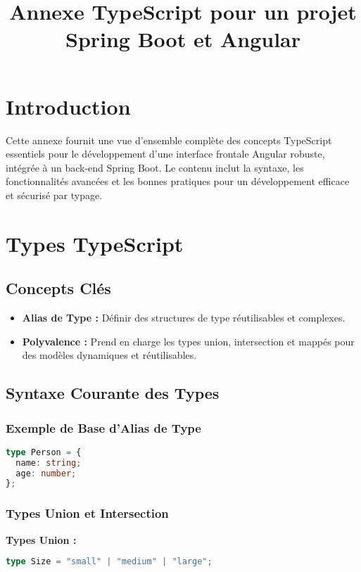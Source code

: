 \documentclass[a4paper,12pt]{article}
\begin{document}
\title{\textbf{Annexe TypeScript pour un projet Spring Boot et Angular}}
\author{}
\date{}
\maketitle

\section*{Introduction}
Cette annexe fournit une vue d'ensemble complète des concepts TypeScript essentiels pour le développement d'une interface frontale Angular robuste, intégrée à un back-end Spring Boot. Le contenu inclut la syntaxe, les fonctionnalités avancées et les bonnes pratiques pour un développement efficace et sécurisé par typage.

\section{Types TypeScript}
\subsection*{Concepts Clés}
\begin{itemize}
    \item \textbf{Alias de Type :} Définir des structures de type réutilisables et complexes.
    \item \textbf{Polyvalence :} Prend en charge les types union, intersection et mappés pour des modèles dynamiques et réutilisables.
\end{itemize}

\subsection*{Syntaxe Courante des Types}
\subsubsection*{Exemple de Base d'Alias de Type}
\begin{lstlisting}[language=TypeScript]
type Person = {
  name: string;
  age: number;
};
\end{lstlisting}

\subsubsection*{Types Union et Intersection}
\textbf{Types Union :}
\begin{lstlisting}[language=TypeScript]
type Size = "small" | "medium" | "large";
\end{lstlisting}
\end{document}
